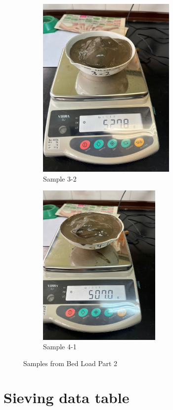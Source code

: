\begin{figure}[H]
    \begin{subfigure}[b]{0.48\textwidth}
        \includegraphics[width=\linewidth, height =9cm]{figures/appendix-f/3-2.jpg}
        \caption{Sample 3-2}
        \label{fig:second}
    \end{subfigure}
    \hfill
    \begin{subfigure}[b]{0.48\textwidth}
        \includegraphics[width=\linewidth, height =8cm]{figures/appendix-f/4-1.jpg}
        \caption{Sample 4-1}
        \label{fig:second}
    \end{subfigure}

    \caption{Samples from Bed Load Part 2}
    \label{fig:all four 2}
\end{figure}

\section{Sieving data table}

